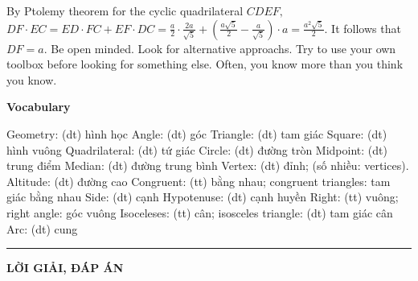 \begin{multicols}{2}
\begin{figure}[H]
		\vspace*{-15pt}
	\end{figure}	
	By Ptolemy theorem for the cyclic quadrilateral $CDEF,$
	$DF \cdot EC = ED \cdot FC + EF \cdot DC 
	= \frac{a}{2}\cdot \frac{2a}{\sqrt{5}} + \left(\frac{a\sqrt{5}}{2} - \frac{a}{\sqrt{5}} \right) \cdot a
	= \frac{a^2\sqrt{5}}{2}$. It follows that $DF = a.$
	\vskip 0.1cm
	Be open minded. Look for alternative approachs. Try to use your own toolbox before looking for something else.
	Often, you know more than you think you know.
\end{multicols} 
\begin{tBox}
	\centerline{\color{toancuabi}\textbf{Vocabulary}}
	\vspace*{-10pt}
	\begin{multicols}{2}
		{\color{toancuabi}Geometry}: (dt) hình học
		\vskip 0.1cm
		{\color{toancuabi}Angle}: (dt) góc
		\vskip 0.1cm
		{\color{toancuabi}Triangle}: (dt) tam giác 
		\vskip 0.1cm
		{\color{toancuabi}Square}: (dt) hình vuông
		\vskip 0.1cm
		{\color{toancuabi}Quadrilateral}: (dt) tứ giác
		\vskip 0.1cm 
		{\color{toancuabi}Circle}: (dt) đường tròn  
		\vskip 0.1cm
		{\color{toancuabi}Midpoint}: (dt) trung điểm
		\vskip 0.1cm
		{\color{toancuabi}Median}: (dt) đường trung bình  
		\vskip 0.1cm
		{\color{toancuabi}Vertex}: (dt) đỉnh; (số nhiều: vertices).
		\vskip 0.1cm
		{\color{toancuabi}Altitude}: (dt) đường cao
		\vskip 0.1cm
		{\color{toancuabi}Congruent}: (tt) bằng nhau;
		{\color{toancuabi}congruent triangles}: tam giác bằng nhau 
		\vskip 0.1cm
		{\color{toancuabi}Side}: (dt)  cạnh
		\vskip 0.1cm
		{\color{toancuabi}Hypotenuse}: (dt) cạnh huyền 
		\vskip 0.1cm
		{\color{toancuabi}Right}: (tt) vuông;
		{\color{toancuabi}right angle}: góc vuông
		\vskip 0.1cm 
		{\color{toancuabi}Isoceleses}: (tt) cân;
		{\color{toancuabi}isosceles triangle}: (dt) tam giác cân 
		\vskip 0.1cm
		{\color{toancuabi}Arc}: (dt) cung
	\end{multicols}
\end{tBox}
\vspace*{-10pt}
{\color{toancuabi}\rule{1\linewidth}{0.1pt}}
\vskip 0.2cm
{\centerline{\textbf{\LARGE\color{toancuabi}LỜI GIẢI, ĐÁP ÁN}}}
